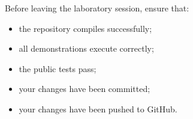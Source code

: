 \documentclass{csc2059practical}
\begin{document}

Before leaving the laboratory session, ensure that:

\begin{itemize}

\item the repository compiles successfully;

\item all demonstrations execute correctly;

\item the public tests pass;

\item your changes have been committed;

\item your changes have been pushed to GitHub.

\end{itemize}
\end{document}

